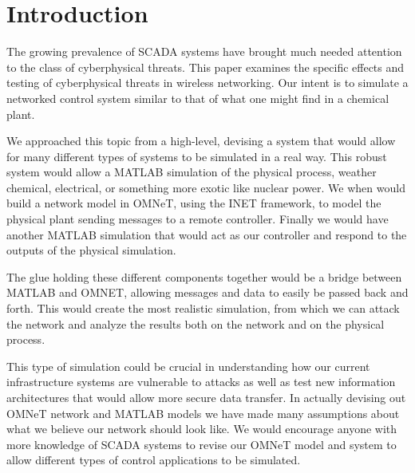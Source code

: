 \section{Introduction}
The growing prevalence of SCADA systems have brought much needed attention to the class of cyberphysical threats.  This paper examines the specific effects and testing of cyberphysical threats in wireless networking.  Our intent is to simulate a networked control system similar to that of what one might find in a chemical plant. 

We approached this topic from a high-level, devising a system that would allow for many different types of systems to be simulated in a real way. This robust system would allow a MATLAB simulation of the physical process, weather chemical, electrical, or something more exotic like nuclear power. We when would build a network model in OMNeT, using the INET framework, to model the physical plant sending messages to a remote controller. Finally we would have another MATLAB simulation that would act as our controller and respond to the outputs of the physical simulation. 

The glue holding these different components together would be a bridge between MATLAB and OMNET, allowing messages and data to easily be passed back and forth. This would create the most realistic simulation, from which we can attack the network and analyze the results both on the network and on the physical process. 

This type of simulation could be crucial in understanding how our current infrastructure systems are vulnerable to attacks as well as test new information architectures that would allow more secure data transfer. In actually devising out OMNeT network and MATLAB models we have made many assumptions about what we believe our network should look like. We would encourage anyone with more knowledge of SCADA systems to revise our OMNeT model and system to allow different types of control applications to be simulated.  

